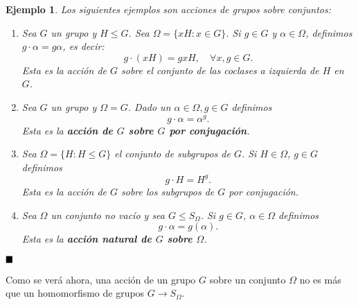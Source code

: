 \documentclass[12pt]{article}
\newtheorem{example}{Ejemplo}[theorem]
\begin{document}
\begin{example}Los siguientes ejemplos son acciones de grupos sobre conjuntos:
\begin{enumerate}
\item Sea $G$ un grupo y $H \leq G$. Sea $\Omega = \lbrace xH : x \in G \rbrace$. Si $g \in G$ y $\alpha \in \Omega$, definimos $g \cdot \alpha = g\alpha$, es decir: $$g \cdot(xH) = gxH, \quad \forall x,g \in G.$$ Esta es la acción de $G$ sobre el conjunto de las coclases a izquierda de $H$ en $G$.
\item Sea $G$ un grupo y $\Omega = G$. Dado un $\alpha \in \Omega, g \in G$ definimos $$g \cdot \alpha= \alpha^g.$$ Esta es la \textbf{acción de $G$ sobre $G$ por conjugación}.
\item Sea $\Omega = \lbrace H : H \leq G \rbrace$ el conjunto de subgrupos de $G$. Si $H \in \Omega$, $g \in G$ definimos $$ g \cdot H = H ^g.$$ Esta es la acción de $G$ sobre los subgrupos de $G$ por conjugación.
\item Sea $\Omega$ un conjunto no vacío y sea $G \leq S_{\Omega}$. Si $g \in G$, $\alpha \in \Omega$ definimos $$g \cdot \alpha = g(\alpha).$$ Esta es la \textbf{acción natural de $G$ sobre $\Omega$}.
\end{enumerate}
\end{example}
$\hfill \blacksquare$

Como se verá ahora, una acción de un grupo $G$ sobre un conjunto $\Omega$ no es más que un homomorfismo de grupos $G \longrightarrow S_{\Omega}$.
\end{document}
